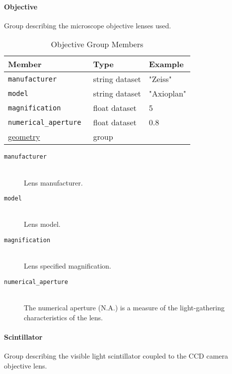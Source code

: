 \paragraph{Objective}
\label{table:objective}

Group describing the microscope objective lenses used.

\begin{table}[h!]\sffamily \footnotesize
\caption{Objective Group Members}
\centering
{}
\begin{tabular}{l l l}
\toprule
\bfseries Member     & \bfseries Type & \bfseries Example \\
\midrule
\tt{manufacturer} & string dataset & "Zeiss"  \\
\tt{model} & string dataset & "Axioplan" \\
\tt{magnification} & float dataset & 5 \\ 
\tt{numerical\_aperture} & float dataset & 0.8 \\
\hyperref[tomo:geometry]{geometry} &  group & \\
\bottomrule
\end{tabular}
\end{table}

\begin{description}
\item[\tt{manufacturer}] \hfill \\
{Lens manufacturer.}

\item[\tt{model}] \hfill \\
{Lens model.}

\item[\tt{magnification}] \hfill \\
{Lens specified magnification.}

\item[\tt{numerical\_aperture}] \hfill \\
{The numerical aperture (N.A.) is a measure of the light-gathering characteristics of the lens.}
\end{description}

\paragraph{Scintillator}
\label{table:scintillator}

Group describing the visible light scintillator coupled to the CCD camera objective lens.

